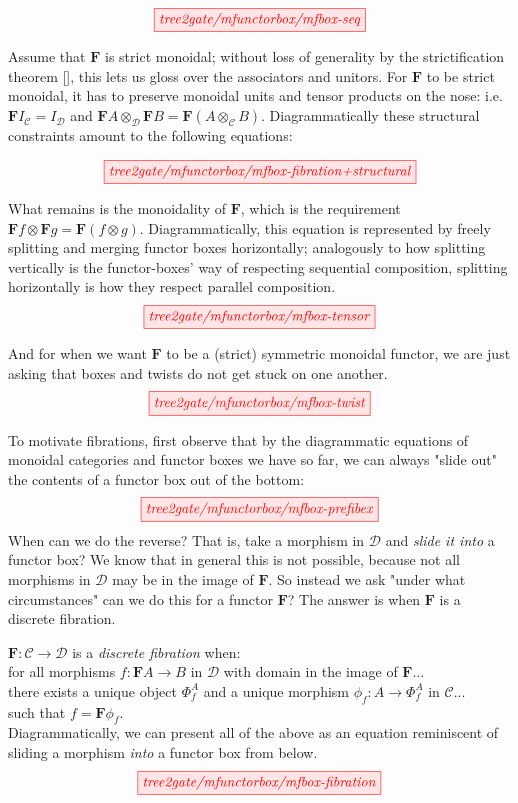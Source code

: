 \[\tikzfig{tree2gate/mfunctorbox/mfbox-seq}\]

Assume that $\mathbf{F}$ is strict monoidal; without loss of generality by the strictification theorem [], this lets us gloss over the associators and unitors. For $\mathbf{F}$ to be strict monoidal, it has to preserve monoidal units and tensor products on the nose: i.e. $\mathbf{F}I_\mathcal{C} = I_\mathcal{D}$ and $\mathbf{F}A \otimes_\mathcal{D} \mathbf{F}B = \mathbf{F}(A \otimes_\mathcal{C} B)$. Diagrammatically these structural constraints amount to the following equations:

\[\tikzfig{tree2gate/mfunctorbox/mfbox-fibration+structural}\]

What remains is the monoidality of $\mathbf{F}$, which is the requirement $\mathbf{F}f \otimes \mathbf{F}g = \mathbf{F}(f \otimes g)$. Diagrammatically, this equation is represented by freely splitting and merging functor boxes horizontally; analogously to how splitting vertically is the functor-boxes' way of respecting sequential composition, splitting horizontally is how they respect parallel composition.
\[\tikzfig{tree2gate/mfunctorbox/mfbox-tensor}\]

And for when we want $\mathbf{F}$ to be a (strict) symmetric monoidal functor, we are just asking that boxes and twists do not get stuck on one another.
\[\tikzfig{tree2gate/mfunctorbox/mfbox-twist}\]

\begin{remark}
To motivate fibrations, first observe that by the diagrammatic equations of monoidal categories and functor boxes we have so far, we can always "slide out" the contents of a functor box out of the bottom:
\[\tikzfig{tree2gate/mfunctorbox/mfbox-prefibex}\]
When can we do the reverse? That is, take a morphism in $\mathcal{D}$ and \emph{slide it into} a functor box? We know that in general this is not possible, because not all morphisms in $\mathcal{D}$ may be in the image of $\mathbf{F}$. So instead we ask "under what circumstances" can we do this for a functor $\mathbf{F}$? The answer is when $\mathbf{F}$ is a discrete fibration.
\end{remark}

\begin{defn}
$\mathbf{F}: \mathcal{C} \rightarrow \mathcal{D}$ is a \emph{discrete fibration} when:\\
for all morphisms $f: \mathbf{F}A \rightarrow B$ in $\mathcal{D}$ with domain in the image of $\mathbf{F}$...\\
there exists a unique object $\Phi^A_f$ and a unique morphism $\phi_f: A \rightarrow \Phi^A_f$ in $\mathcal{C}$...\\
such that $f = \mathbf{F}\phi_f$.\\

Diagrammatically, we can present all of the above as an equation reminiscent of sliding a morphism \emph{into} a functor box from below.
\[\tikzfig{tree2gate/mfunctorbox/mfbox-fibration}\]
\end{defn}

